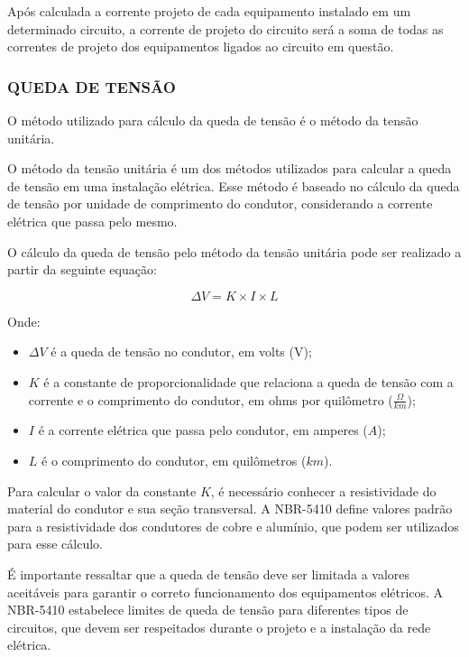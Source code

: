 Após calculada a corrente projeto de cada equipamento instalado em um determinado circuito, a corrente de projeto do circuito será a soma de todas as correntes de projeto dos equipamentos ligados ao circuito em questão.

\subsubsection{QUEDA DE TENSÃO}

O método utilizado para cálculo da queda de tensão é o método da tensão unitária.

O método da tensão unitária é um dos métodos utilizados para calcular a queda de tensão em uma instalação elétrica. Esse método é baseado no cálculo da queda de tensão por unidade de comprimento do condutor, considerando a corrente elétrica que passa pelo mesmo.

O cálculo da queda de tensão pelo método da tensão unitária pode ser realizado a partir da seguinte equação:

\begin{equation}
	\Delta V = K \times I \times L
\end{equation}

Onde:

\begin{itemize}
	\item $\Delta V$ é a queda de tensão no condutor, em volts (V);
	\item $K$ é a constante de proporcionalidade que relaciona a queda de tensão com a corrente e o comprimento do condutor, em ohms por quilômetro ($\frac{\Omega}{km}$);
	\item $I$ é a corrente elétrica que passa pelo condutor, em amperes ($A$);
	\item $L$ é o comprimento do condutor, em quilômetros ($km$).	
\end{itemize}


Para calcular o valor da constante $K$, é necessário conhecer a resistividade do material do condutor e sua seção transversal. A NBR-5410 define valores padrão para a resistividade dos condutores de cobre e alumínio, que podem ser utilizados para esse cálculo.

É importante ressaltar que a queda de tensão deve ser limitada a valores aceitáveis para garantir o correto funcionamento dos equipamentos elétricos. A NBR-5410 estabelece limites de queda de tensão para diferentes tipos de circuitos, que devem ser respeitados durante o projeto e a instalação da rede elétrica.

